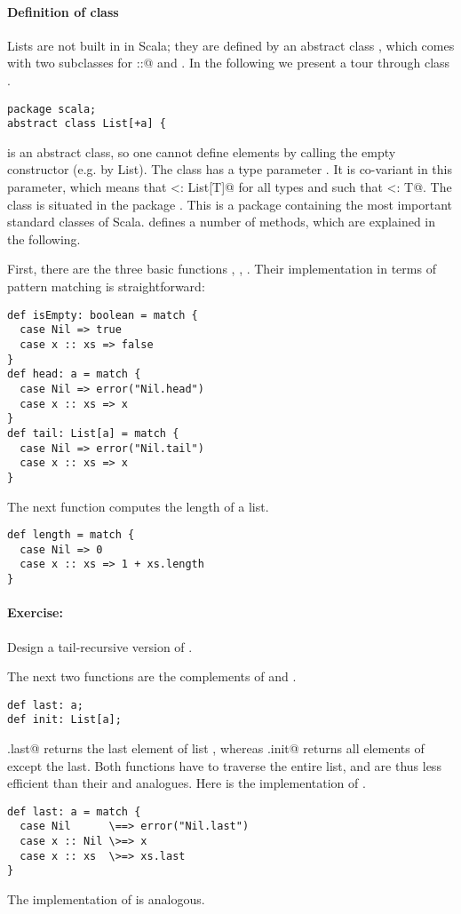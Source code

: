 \documentclass[11pt]{book}
\newcommand{\exercise}{\paragraph{Exercise:}}
\begin{document}
\paragraph{Definition of class \verb@List@}

Lists are not built in in Scala; they are defined by an abstract class
\verb@List@, which comes with two subclasses for \verb@::@ and \verb@Nil@.
In the following we present a tour through class \verb@List@.
\begin{verbatim}
package scala;
abstract class List[+a] {
\end{verbatim}
\verb@List@ is an abstract class, so one cannot define elements by
calling the empty \verb@List@ constructor (e.g. by
\verb@new List).  The class has a type parameter \verb@a@. It is
co-variant in this parameter, which means that
\verb@List[S] <: List[T]@ for all types \verb@S@ and \verb@T@ such that
\verb@S <: T@.  The class is situated in the package
\verb@scala@. This is a package containing the most important standard
classes of Scala. \verb@List@ defines a number of methods, which are
explained in the following.

First, there are the three basic functions \verb@isEmpty@, 
\verb@head@, \verb@tail@. Their implementation in terms of pattern
matching is straightforward:
\begin{verbatim}
def isEmpty: boolean = match {
  case Nil => true
  case x :: xs => false 
}   
def head: a = match { 
  case Nil => error("Nil.head") 
  case x :: xs => x 
}
def tail: List[a] = match { 
  case Nil => error("Nil.tail") 
  case x :: xs => x 
}
\end{verbatim}

The next function computes the length of a list.
\begin{verbatim}
def length = match {
  case Nil => 0
  case x :: xs => 1 + xs.length
}
\end{verbatim}

\exercise Design a tail-recursive version of \verb@length@.

The next two functions are the complements of \verb@head@ and
\verb@tail@.
\begin{verbatim}
def last: a;
def init: List[a];
\end{verbatim}
\verb@xs.last@ returns the last element of list \verb@xs@, whereas
\verb@xs.init@ returns all elements of \verb@xs@ except the last.
Both functions have to traverse the entire list, and are thus less
efficient than their \verb@head@ and \verb@tail@ analogues.
Here is the implementation of \verb@last@.
\begin{verbatim}
def last: a = match {
  case Nil      \==> error("Nil.last")
  case x :: Nil \>=> x
  case x :: xs  \>=> xs.last
}
\end{verbatim}
The implementation of \verb@init@ is analogous.
\end{document}
